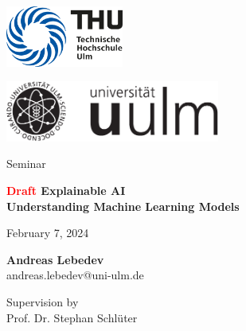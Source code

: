 \thispagestyle{empty}

\begin{minipage}{0.3\textwidth}
    \flushleft
    \includegraphics[height=2cm]{init/thu_logo.pdf}
\end{minipage}
\hfill
\begin{minipage}{0.6\textwidth}
    \flushright
    \includegraphics[height=2cm]{init/Logo_uulm_Vorlage_100mm_schwarz.pdf}\\
\end{minipage}

\vfill
\begin{center}
{
    \Large Seminar
}
\end{center}

\vspace{10mm}
\begin{center}
{
    \bf \Huge \textcolor{red}{Draft} Explainable AI \\
    \vspace{3mm}
    \Large Understanding Machine Learning Models
}
\end{center}

\vspace{8mm}
\begin{center}
{ 
    \Large 
    February 7, 2024
}
\end{center}

\vspace{8mm}
\begin{center}
{
    \large {\bf Andreas Lebedev}\\
    \vspace{1mm}
    \footnotesize andreas.lebedev@uni-ulm.de\\
}
\end{center}

\vfill
Supervision by \\
Prof. Dr. Stephan Schlüter
